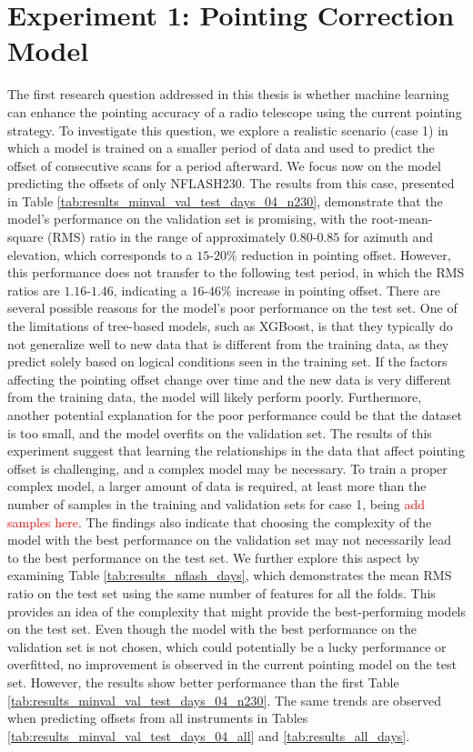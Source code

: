 \section{Experiment 1: Pointing Correction Model}
The first research question addressed in this thesis is whether machine learning can enhance the pointing accuracy of a radio telescope using the current pointing strategy.
To investigate this question, we explore a realistic scenario (case 1) in which a model is trained on a smaller period of data and used to predict the offset of consecutive scans for a period afterward.
We focus now on the model predicting the offsets of only NFLASH230.
The results from this case, presented in Table \ref{tab:results_minval_val_test_days_04_n230}, demonstrate that the model's performance on the validation set is promising,
with the root-mean-square (RMS) ratio in the range of approximately $0.80$-$0.85$ for azimuth and elevation,
which corresponds to a $15$-$20\%$ reduction in pointing offset.
However, this performance does not transfer to the following test period,
in which the RMS ratios are $1.16$-$1.46$, indicating a $16$-$46\%$ increase in pointing offset.
There are several possible reasons for the model's poor performance on the test set.
One of the limitations of tree-based models, such as XGBoost, is that they typically do not generalize well to new data that is different from the training data,
as they predict solely based on logical conditions seen in the training set.
If the factors affecting the pointing offset change over time and the new data is very different from the training data, the model will likely perform poorly. 
Furthermore, another potential explanation for the poor performance could be that the dataset is too small, and the model overfits on the validation set.
The results of this experiment suggest that learning the relationships in the data that affect pointing offset is challenging, and a complex model may be necessary.
To train a proper complex model, a larger amount of data is required, at least more than the number of samples in the training and validation sets for case 1, being \textcolor{red}{add samples here}.
The findings also indicate that choosing the complexity of the model with the best performance on the validation set may not necessarily lead to the best performance on the test set.
We further explore this aspect by examining Table \ref{tab:results_nflash_days}, which demonstrates the mean RMS ratio on the test set using the same number of features for all the folds.
This provides an idea of the complexity that might provide the best-performing models on the test set.
Even though the model with the best performance on the validation set is not chosen, which could potentially be a lucky performance or overfitted,
no improvement is observed in the current pointing model on the test set.
However, the results show better performance than the first Table \ref{tab:results_minval_val_test_days_04_n230}.
The same trends are observed when predicting offsets from all instruments in Tables \ref{tab:results_minval_val_test_days_04_all} and \ref{tab:results_all_days}. \\



